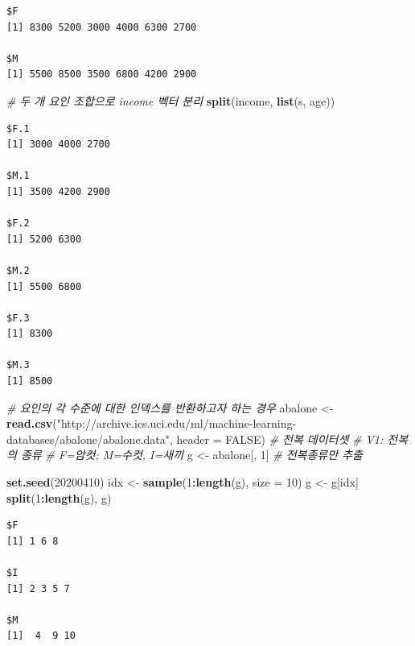 \documentclass[
  11pt,
]{krantz}
\newenvironment{Shaded}{\begin{snugshade}}{\end{snugshade}}
\newcommand{\CommentTok}[1]{\textcolor[rgb]{0.37,0.37,0.37}{\textit{#1}}}
\newcommand{\DataTypeTok}[1]{\textcolor[rgb]{0.27,0.27,0.27}{#1}}
\newcommand{\DecValTok}[1]{\textcolor[rgb]{0.06,0.06,0.06}{#1}}
\newcommand{\KeywordTok}[1]{\textcolor[rgb]{0.27,0.27,0.27}{\textbf{#1}}}
\newcommand{\NormalTok}[1]{#1}
\newcommand{\OperatorTok}[1]{\textcolor[rgb]{0.43,0.43,0.43}{\textbf{#1}}}
\newcommand{\OtherTok}[1]{\textcolor[rgb]{0.37,0.37,0.37}{#1}}
\newcommand{\StringTok}[1]{\textcolor[rgb]{0.5,0.5,0.5}{#1}}
\begin{document}
\begin{verbatim}
$F
[1] 8300 5200 3000 4000 6300 2700

$M
[1] 5500 8500 3500 6800 4200 2900
\end{verbatim}

\begin{Shaded}
\begin{Highlighting}[]
\CommentTok{# 두 개 요인 조합으로 income 벡터 분리 }
\KeywordTok{split}\NormalTok{(income, }\KeywordTok{list}\NormalTok{(s, age))}
\end{Highlighting}
\end{Shaded}

\begin{verbatim}
$F.1
[1] 3000 4000 2700

$M.1
[1] 3500 4200 2900

$F.2
[1] 5200 6300

$M.2
[1] 5500 6800

$F.3
[1] 8300

$M.3
[1] 8500
\end{verbatim}

\begin{Shaded}
\begin{Highlighting}[]
\CommentTok{# 요인의 각 수준에 대한 인덱스를 반환하고자 하는 경우}
\NormalTok{abalone <-}\StringTok{ }\KeywordTok{read.csv}\NormalTok{(}\StringTok{"http://archive.ics.uci.edu/ml/machine-learning-databases/abalone/abalone.data"}\NormalTok{, }
    \DataTypeTok{header =} \OtherTok{FALSE}\NormalTok{) }\CommentTok{# 전복 데이터셋}
\CommentTok{# V1: 전복의 종류}
\CommentTok{# F=암컷; M=수컷, I=새끼}
\NormalTok{g <-}\StringTok{ }\NormalTok{abalone[, }\DecValTok{1}\NormalTok{] }\CommentTok{# 전복종류만 추출}

\KeywordTok{set.seed}\NormalTok{(}\DecValTok{20200410}\NormalTok{)}
\NormalTok{idx <-}\StringTok{ }\KeywordTok{sample}\NormalTok{(}\DecValTok{1}\OperatorTok{:}\KeywordTok{length}\NormalTok{(g), }\DataTypeTok{size =} \DecValTok{10}\NormalTok{)}
\NormalTok{g <-}\StringTok{ }\NormalTok{g[idx]}
\KeywordTok{split}\NormalTok{(}\DecValTok{1}\OperatorTok{:}\KeywordTok{length}\NormalTok{(g), g)}
\end{Highlighting}
\end{Shaded}

\begin{verbatim}
$F
[1] 1 6 8

$I
[1] 2 3 5 7

$M
[1]  4  9 10
\end{verbatim}
\end{document}
